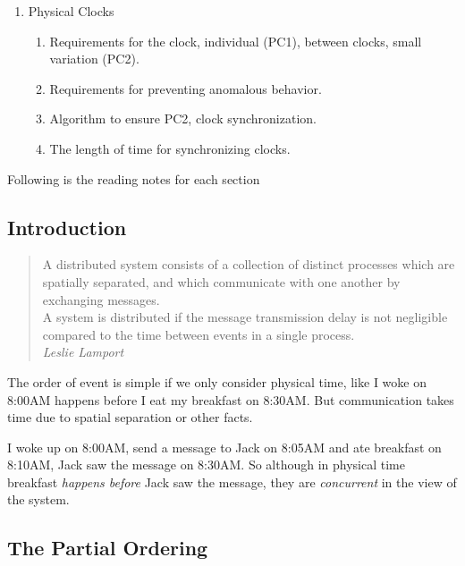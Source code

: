 \documentclass[12pt,a4paper,oneside]{article}
\begin{document}
\begin{enumerate}
\begin{enumerate}
  \end{enumerate}
  \item Physical Clocks
  \begin{enumerate}
      \item Requirements for the clock, individual (PC1), between clocks, small variation (PC2).
      \item Requirements for preventing anomalous behavior.
      \item Algorithm to ensure PC2, clock synchronization.
      \item The length of time for synchronizing clocks.
  \end{enumerate}
\end{enumerate}

Following is the reading notes for each section

\subsection{Introduction}

\begin{quote}
  A distributed system consists of a collection of distinct processes which are
spatially separated, and which communicate with one another by exchanging messages. \\
  A system is distributed if the message transmission delay is not negligible compared
to the time between events in a single process.\cite{l} \\

\textit{Leslie Lamport}
\end{quote}

The order of event is simple if we only consider physical time, like I woke on 8:00AM happens before
I eat my breakfast on 8:30AM.
But communication takes time due to spatial separation or other facts.

I woke up on 8:00AM, send a message to Jack on 8:05AM and ate breakfast on 8:10AM, Jack saw the message
on 8:30AM.
So although in physical time breakfast \textit{happens before} Jack saw the message, they are \textit{concurrent}
in the view of the system.

\subsection{The Partial Ordering}
\end{document}
